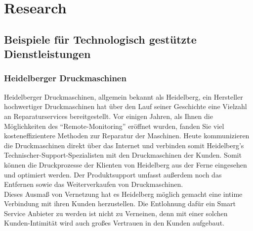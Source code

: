 \chapter{Research}
\section{Beispiele für Technologisch gestützte Dienstleistungen}
\subsection{Heidelberger Druckmaschinen}
Heidelberger Druckmaschinen, allgemein bekannt als Heidelberg, ein Hersteller hochwertiger Druckmaschinen hat über den Lauf seiner Geschichte eine Vielzahl an Reparaturservices bereitgestellt.
Vor einigen Jahren, als Ihnen die Möglichkeiten des \enquote{Remote-Monitoring} eröffnet wurden, fanden Sie viel kosteneffizientere Methoden zur Reparatur der Maschinen.
Heute kommunizieren die Druckmaschinen direkt über das Internet und verbinden somit Heidelberg's Technischer-Support-Spezialisten mit den Druckmaschinen der Kunden.
Somit können die Druckprozesse der Klienten von Heidelberg aus der Ferne eingesehen und optimiert werden.
Der Produktsupport umfasst außerdem noch das Entfernen sowie das Weiterverkaufen von Druckmaschinen.
\\
Dieses Ausmaß von Vernetzung hat es Heidelberg möglich gemacht eine intime Verbindung mit ihren Kunden herzustellen.
Die Entlohnung dafür ein Smart Service Anbieter zu werden ist nicht zu Verneinen, denn mit einer solchen Kunden-Intimität wird auch großes Vertrauen in den Kunden aufgebaut.
\subsection{}
